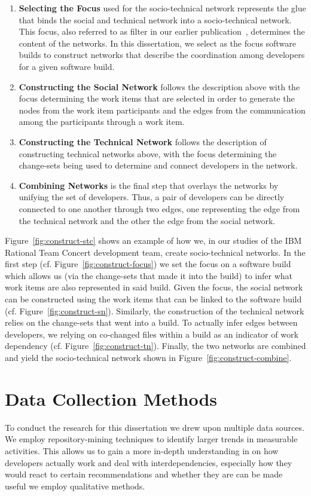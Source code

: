 \begin{enumerate}
\item\textbf{Selecting the Focus} used for the socio-technical network represents the glue that binds the social and technical network into a socio-technical network. 
This focus, also referred to as filter in our earlier publication~\cite{wolf:ieee:2009}, determines the content of the networks.
In this dissertation, we select as the focus software builds to construct networks that describe the coordination among developers for a given software build.
\item\textbf{Constructing the Social Network} follows the description above with the focus determining the work items that are selected in order to generate the nodes from the work item participants and the edges from the communication among the participants through a work item.
\item\textbf{Constructing the Technical Network} follows the description of constructing technical networks above, with the focus determining the change-sets being used to determine and connect developers in the network.
\item\textbf{Combining Networks} is the final step that overlays the networks by unifying the set of developers.
Thus, a pair of developers can be directly connected to one another through two edges, one representing the edge from the technical network and the other the edge from the social network.
\end{enumerate}

Figure~\ref{fig:construct-stc} shows an example of how we, in our studies of the IBM Rational Team Concert development team, create socio-technical networks.
In the first step (cf. Figure~\ref{fig:construct-focus}) we set the focus on a software build which allows us (via the change-sets that made it into the build) to infer what work items are also represented in said build.
Given the focus, the social network can be constructed using the work items that can be linked to the software build (cf. Figure~\ref{fig:construct-sn}).
Similarly, the construction of the technical network relies on the change-sets that went into a build. 
To actually infer edges between developers, we relying on co-changed files within a build as an indicator of work dependency (cf. Figure~\ref{fig:construct-tn}).
Finally, the two networks are combined and yield the socio-technical network shown in Figure~\ref{fig:construct-combine}.

\section{Data Collection Methods}
\label{c5:sec:datacollection}
To conduct the research for this dissertation we drew upon multiple data sources.
We employ repository-mining techniques to identify larger trends in measurable activities.
This allows us to gain a more in-depth understanding in on how developers actually work and deal with interdependencies, especially how they would react to certain recommendations and whether they are can be made useful we employ qualitative methods.

